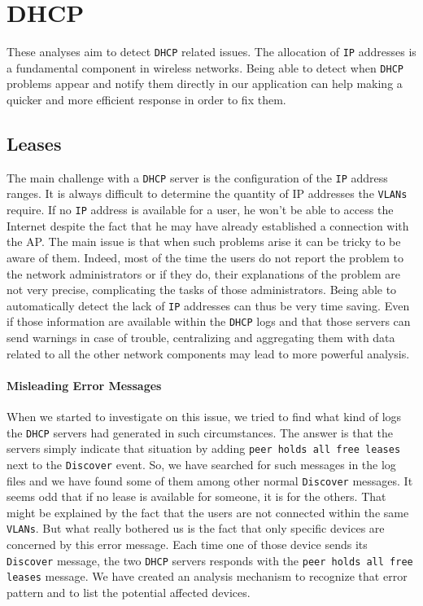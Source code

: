 \section{DHCP}
These analyses aim to detect \texttt{DHCP} related issues. The allocation of \texttt{IP} addresses is a fundamental component in wireless networks. Being able to detect when \texttt{DHCP} problems appear and notify them directly in our application can help making a quicker and more efficient response in order to fix them.

\subsection{Leases}
The main challenge with a \texttt{DHCP} server is the configuration of the \texttt{IP} address ranges. It is always difficult to determine the quantity of IP addresses the \texttt{VLANs} require. If no \texttt{IP} address is available for a user, he won't be able to access the Internet despite the fact that he may have already established a connection with the AP. The main issue is that when such problems arise it can be tricky to be aware of them. Indeed, most of the time the users do not report the problem to the network administrators or if they do, their explanations of the problem are not very precise, complicating the tasks of those administrators. Being able to automatically detect the lack of \texttt{IP} addresses can thus be very time saving. Even if those information are available within the \texttt{DHCP} logs and that those servers can send warnings in case of trouble, centralizing and aggregating them with data related to all the other network components may lead to more powerful analysis.


\paragraph*{Misleading Error Messages} When we started to investigate on this issue, we tried to find what kind of logs the \texttt{DHCP} servers had generated in such circumstances. The answer is that the servers simply indicate that situation by adding \texttt{peer holds all free leases} next to the \texttt{Discover} event. So, we have searched for such messages in the log files and we have found some of them among other normal \texttt{Discover} messages. It seems odd that if no lease is available for someone, it is for the others. That might be explained by the fact that the users are not connected within the same \texttt{VLANs}. But what really bothered us is the fact that only specific devices are concerned by this error message. Each time one of those device sends its \texttt{Discover} message, the two \texttt{DHCP} servers responds with the \texttt{peer holds all free leases} message. We have created an analysis mechanism to recognize that error pattern and to list the potential affected devices. \\

